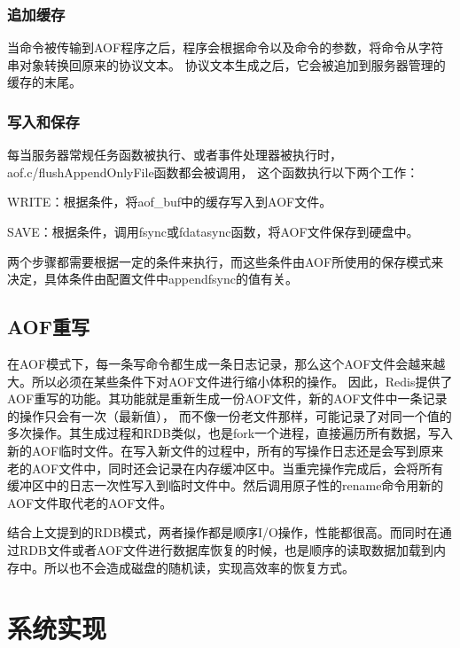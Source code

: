 \documentclass{zjutthesis}
\begin{document}
\subsection{追加缓存}
当命令被传输到AOF程序之后，程序会根据命令以及命令的参数，将命令从字符串对象转换回原来的协议文本。
协议文本生成之后，它会被追加到服务器管理的缓存的末尾。

\subsection{写入和保存}
每当服务器常规任务函数被执行、或者事件处理器被执行时，aof.c/flushAppendOnlyFile函数都会被调用，
这个函数执行以下两个工作：

WRITE：根据条件，将aof\_buf中的缓存写入到AOF文件。

SAVE：根据条件，调用fsync或fdatasync函数，将AOF文件保存到硬盘中。

两个步骤都需要根据一定的条件来执行，而这些条件由AOF所使用的保存模式来决定，具体条件由配置文件中appendfsync的值有关。

\section{AOF重写}
在AOF模式下，每一条写命令都生成一条日志记录，那么这个AOF文件会越来越大。所以必须在某些条件下对AOF文件进行缩小体积的操作。
因此，Redis提供了AOF重写的功能。其功能就是重新生成一份AOF文件，新的AOF文件中一条记录的操作只会有一次（最新值），
而不像一份老文件那样，可能记录了对同一个值的多次操作。其生成过程和RDB类似，也是fork一个进程，直接遍历所有数据，写入新的AOF临时文件。在写入新文件的过程中，所有的写操作日志还是会写到原来老的AOF文件中，同时还会记录在内存缓冲区中。当重完操作完成后，会将所有缓冲区中的日志一次性写入到临时文件中。然后调用原子性的rename命令用新的AOF文件取代老的AOF文件。

结合上文提到的RDB模式，两者操作都是顺序I/O操作，性能都很高。而同时在通过RDB文件或者AOF文件进行数据库恢复的时候，也是顺序的读取数据加载到内存中。所以也不会造成磁盘的随机读，实现高效率的恢复方式。


\chapter{系统实现}
\end{document}
